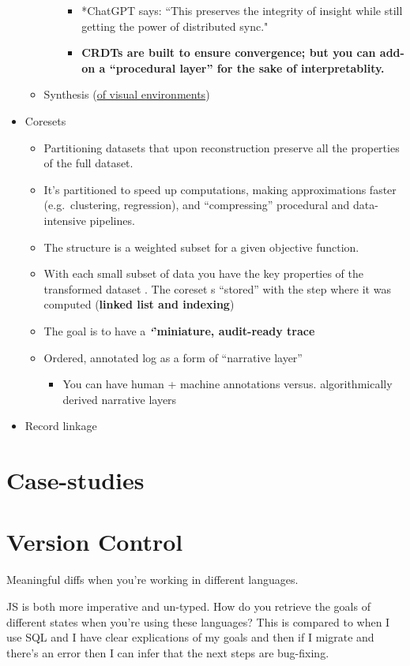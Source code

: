 \documentclass[
]{article}
\providecommand{\tightlist}{%
  \setlength{\itemsep}{0pt}\setlength{\parskip}{0pt}}\usepackage{longtable,booktabs,array}
\begin{document}
\begin{itemize}
\begin{itemize}
\begin{itemize}
      \begin{itemize}
      \item
        *ChatGPT says: ``This preserves the integrity of insight while
        still getting the power of distributed sync."
      \item
        \textbf{CRDTs are built to ensure convergence; but you can
        add-on a ``procedural layer'' for the sake of interpretablity.}
      \end{itemize}
    \end{itemize}
  \item
    Synthesis (\href{https://core.ac.uk/download/pdf/29195125.pdf}{of
    visual environments})
  \end{itemize}
\item
  Coresets

  \begin{itemize}
  \item
    Partitioning datasets that upon reconstruction preserve all the
    properties of the full dataset.
  \item
    It's partitioned to speed up computations, making approximations
    faster (e.g.~clustering, regression), and ``compressing'' procedural
    and data-intensive pipelines.
  \item
    The structure is a weighted subset for a given objective function.
  \item
    With each small subset of data you have the key properties of the
    transformed dataset . The coreset s ``stored'' with the step where
    it was computed (\textbf{linked list and indexing})
  \item
    The goal is to have a \textbf{\emph{`}'miniature, audit-ready trace}
  \item
    Ordered, annotated log as a form of ``narrative layer''

    \begin{itemize}
    \tightlist
    \item
      You can have human + machine annotations versus. algorithmically
      derived narrative layers
    \end{itemize}
  \end{itemize}
\item
  Record linkage
\end{itemize}

\section{Case-studies}\label{case-studies}

\section{Version Control}\label{version-control}

Meaningful diffs when you're working in different languages.

JS is both more imperative and un-typed. How do you retrieve the goals
of different states when you're using these languages? This is compared
to when I use SQL and I have clear explications of my goals and then if
I migrate and there's an error then I can infer that the next steps are
bug-fixing.
\end{document}

